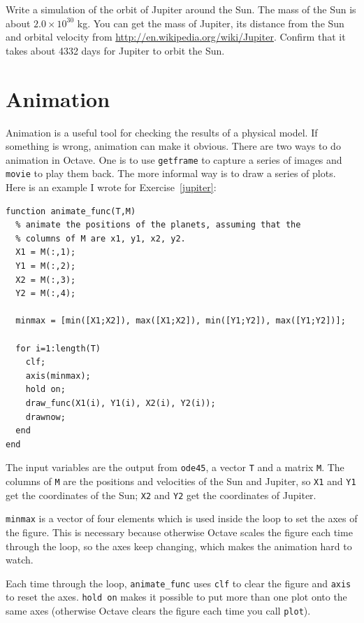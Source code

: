\documentclass{book}
\begin{document}
\begin{ex}
\label{jupiter}
Write a simulation of the orbit of Jupiter around the Sun. The mass
of the Sun is about $2.0 \times 10^{30}$ kg. You can get the mass of
Jupiter, its distance from the Sun and orbital velocity from
\url{http://en.wikipedia.org/wiki/Jupiter}. Confirm that it takes
about 4332 days for Jupiter to orbit the Sun.
\end{ex}

\section{Animation}

Animation is a useful tool for checking the results of a physical
model. If something is wrong, animation can make it obvious.
There are two ways to do animation in Octave. One is to use
{\tt getframe} to capture a series of images and {\tt movie} to
play them back.
The more informal way is to draw a series of plots.
Here is an example I wrote for Exercise~\ref{jupiter}:

\begin{verbatim}
function animate_func(T,M)
  % animate the positions of the planets, assuming that the
  % columns of M are x1, y1, x2, y2.
  X1 = M(:,1);
  Y1 = M(:,2);
  X2 = M(:,3);
  Y2 = M(:,4);

  minmax = [min([X1;X2]), max([X1;X2]), min([Y1;Y2]), max([Y1;Y2])];

  for i=1:length(T)
    clf;
    axis(minmax);
    hold on;
    draw_func(X1(i), Y1(i), X2(i), Y2(i));
    drawnow;
  end
end
\end{verbatim}

The input variables are the output from {\tt ode45}, a vector
{\tt T} and a matrix {\tt M}. The columns of {\tt M} are the
positions and velocities of the Sun and Jupiter, so
{\tt X1} and {\tt Y1} get the coordinates of the Sun;
{\tt X2} and {\tt Y2} get the coordinates of Jupiter.

{\tt minmax} is a vector of four elements which is used inside
the loop to set the axes of the figure. This is necessary because
otherwise Octave scales the figure each time through the loop,
so the axes keep changing, which makes the animation hard
to watch.

Each time through the loop, {\tt animate\_func} uses {\tt clf}
to clear the figure and {\tt axis} to reset the axes. {\tt hold
on} makes it possible to put more than one plot onto the same
axes (otherwise Octave clears the figure each time you call
{\tt plot}).
\end{document}
